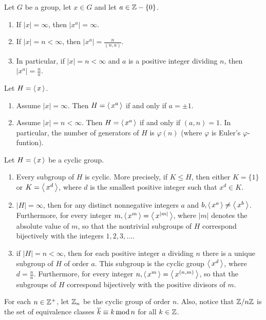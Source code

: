 \documentclass[10pt,a4paper]{report}
\begin{document}
\begin{prop} Let $G$ be a group, let $x \in G$ and let $a \in \mathbb{Z}-\{0\}$.
\begin{enumerate}
	\item If $|x| = \infty$, then $|x^a|=\infty$.
	\item If $|x| = n < \infty$, then $|x^a|=\frac{n}{(n,a)}$.
	\item In particular, if $|x|=n<\infty$ and $a$ is a positive integer dividing $n$, then $|x^a|=\frac{n}{a}$.
\end{enumerate}
\end{prop}

\begin{prop}Let $H = \left \langle\, x \,\right \rangle$.
\begin{enumerate}
	\item Assume $|x|=\infty$.  Then $H = \left \langle\, x^a \,\right \rangle$ if and only if $a = \pm 1$.
	\item Assume $|x|=n < \infty$.  Then $H =\left \langle\, x^a \,\right \rangle$ if and only if $(a,n)=1$.  In particular, the number of generators of $H$ is $\varphi(n)$ (where $\varphi$ is Euler's $\varphi$-funtion).
\end{enumerate}
\end{prop}

\begin{theorem}Let $H = \left \langle\, x \,\right \rangle$ be a cyclic group.
\begin{enumerate}
	\item Every subgroup of $H$ is cyclic.  More precisely, if $K \le H$, then either $K=\{1\}$ or $K = \left \langle\, x^d \,\right \rangle$, where $d$ is the smallest positive integer such that $x^d\in K$.
	\item $|H|=\infty$, then for any distinct nonnegative integers $a$ and $b, \left \langle\, x^a \,\right \rangle \ne \left \langle\, x^b \,\right \rangle$.  Furthermore, for every integer $m, \left \langle\, x^m \,\right \rangle=\left \langle\, x^{|m|} \,\right \rangle$, where $|m|$ denotes the absolute value of $m$, so that the nontrivial subgroups of $H$ correspond bijectively with the integers $1,2,3,\dots$.
	\item if $|H|=n<\infty$, then for each positive integer $a$ dividing $n$ there is a unique subgroup of $H$ of order $a$.  This subgroup is the cyclic group $\left \langle\, x^d \,\right \rangle$, where $d=\frac{n}{a}$.  Furthermore, for every integer $n, \left \langle\, x^m \,\right \rangle=\left \langle\, x^{(n,m)} \,\right \rangle$, so that the subgroups of $H$ correspond bijectively with the positive divisors of $m$.
\end{enumerate}
\end{theorem}

\begin{remark}[Notation]For each $n \in\mathbb{Z}^+$, let $\mathbb{Z}_n$ be the cyclic group of order $n$.  Also, notice that $\mathbb{Z}/n\mathbb{Z}$ is the set of equivalence classes $\overline{k}\equiv k \operatorname{mod} n$ for all $k\in \mathbb{Z}$.
\end{remark}
\end{document}
